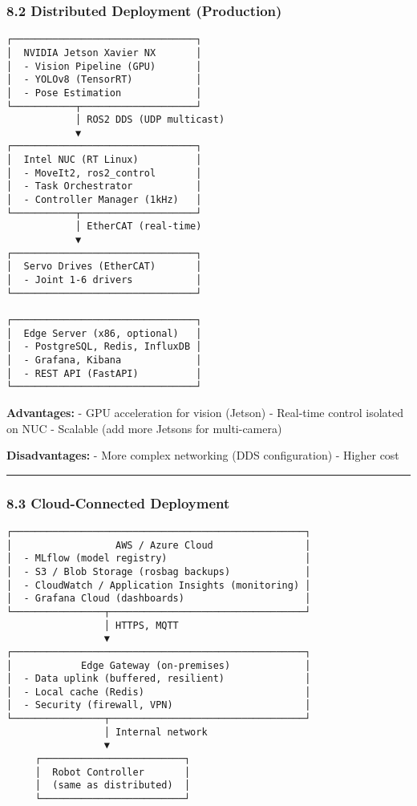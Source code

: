 \documentclass[
]{article}
\begin{document}
\hypertarget{distributed-deployment-production}{%
\subsubsection{8.2 Distributed Deployment
(Production)}\label{distributed-deployment-production}}

\begin{verbatim}
┌────────────────────────────────┐
│  NVIDIA Jetson Xavier NX       │
│  - Vision Pipeline (GPU)       │
│  - YOLOv8 (TensorRT)           │
│  - Pose Estimation             │
└───────────┬────────────────────┘
            │ ROS2 DDS (UDP multicast)
            ▼
┌────────────────────────────────┐
│  Intel NUC (RT Linux)          │
│  - MoveIt2, ros2_control       │
│  - Task Orchestrator           │
│  - Controller Manager (1kHz)   │
└───────────┬────────────────────┘
            │ EtherCAT (real-time)
            ▼
┌────────────────────────────────┐
│  Servo Drives (EtherCAT)       │
│  - Joint 1-6 drivers           │
└────────────────────────────────┘

┌────────────────────────────────┐
│  Edge Server (x86, optional)   │
│  - PostgreSQL, Redis, InfluxDB │
│  - Grafana, Kibana             │
│  - REST API (FastAPI)          │
└────────────────────────────────┘
\end{verbatim}

\textbf{Advantages:} - GPU acceleration for vision (Jetson) - Real-time
control isolated on NUC - Scalable (add more Jetsons for multi-camera)

\textbf{Disadvantages:} - More complex networking (DDS configuration) -
Higher cost

\begin{center}\rule{0.5\linewidth}{0.5pt}\end{center}

\hypertarget{cloud-connected-deployment}{%
\subsubsection{8.3 Cloud-Connected
Deployment}\label{cloud-connected-deployment}}

\begin{verbatim}
┌───────────────────────────────────────────────────┐
│                  AWS / Azure Cloud                │
│  - MLflow (model registry)                        │
│  - S3 / Blob Storage (rosbag backups)             │
│  - CloudWatch / Application Insights (monitoring) │
│  - Grafana Cloud (dashboards)                     │
└────────────────┬──────────────────────────────────┘
                 │ HTTPS, MQTT
                 ▼
┌───────────────────────────────────────────────────┐
│            Edge Gateway (on-premises)             │
│  - Data uplink (buffered, resilient)              │
│  - Local cache (Redis)                            │
│  - Security (firewall, VPN)                       │
└────────────────┬──────────────────────────────────┘
                 │ Internal network
                 ▼
     ┌─────────────────────────┐
     │  Robot Controller       │
     │  (same as distributed)  │
     └─────────────────────────┘
\end{verbatim}
\end{document}
